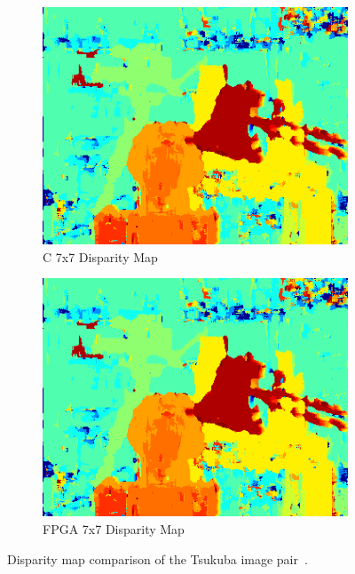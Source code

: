 \begin{figure}
\begin{center}
\begin{subfigure}{0.45\textwidth}
		\includegraphics[width=\textwidth]{figures/tsukuba_c_7x7.png}
		\caption{C 7x7 Disparity Map}
		\label{fig:tsukubaC7x7}
	\end{subfigure}
	\begin{subfigure}{0.45\textwidth}
		\includegraphics[width=\textwidth]{figures/tsukuba_buffer_7x7_2.png}
		\caption{FPGA 7x7 Disparity Map}
		\label{fig:tsukubaFPGA7x7}
	\end{subfigure}
	\captionfonts
	\caption{Disparity map comparison of the Tsukuba image pair~\cite{middlebury}.}
	\label{fig:tsukubaDispMap}
\end{center}
\end{figure}


